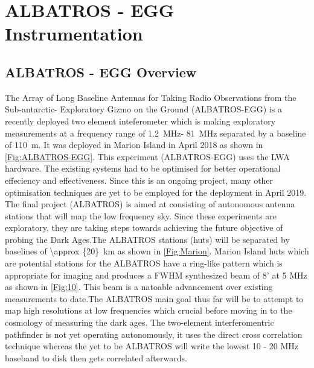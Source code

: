 \documentclass[12pt,a4paper]{report}
\begin{document}
\chapter{ALBATROS - EGG Instrumentation}
\section{ALBATROS - EGG Overview}
		
The Array of Long Baseline Antennas for Taking Radio Observations from the Sub-antarctic- Exploratory Gizmo on the Ground (ALBATROS-EGG) is a recently deployed two element inteferometer which is making exploratory measurements at a frequency range of \SI{1.2}{MHz}- \SI{81}{MHz} separated by a baseline of \SI{110}{m}. It was deployed in Marion Island in April 2018 as shown in \autoref{Fig:ALBATROS-EGG}. This experiment (ALBATROS-EGG) uses the LWA hardware.  The existing systems had to be optimised for better operational effeciency and effectiveness. Since this is an ongoing project, many other optimisation techniques are yet to be employed for the deployment in April 2019. \\

The final project (ALBATROS) is aimed at consisting of autonomous antenna stations that will map the low frequency sky. Since these experiments are exploratory, they are taking steps towards achieving the future objective of probing the Dark Ages.The ALBATROS stations (huts) will be separated by baselines of \SI{\approx {20}}{km} as shown in \autoref{Fig:Marion}. Marion Island huts which are potential stations for the ALBATROS have a ring-like pattern which is appropriate for imaging and produces a FWHM synthesized beam of 8' at 5 MHz as shown in \autoref{Fig:10}. This beam is a natoable advancement over existing measurements to date.The ALBATROS main goal thus far will be to attempt to map high resolutions at low frequencies which crucial before moving in to the cosmology of measuring the dark ages. The two-element interferomentric pathfinder is not yet operating autonomously, it uses the direct cross correlation technique whereas the yet to be ALBATROS will write the lowest 10 - 20 MHz baseband to disk then gets correlated afterwards.\\
\end{document}
